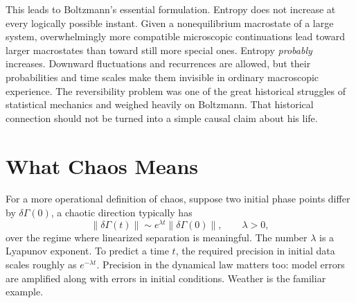 \begin{classroomqa}
\end{classroomqa}

\begin{classroomqa}
\end{classroomqa}

This leads to Boltzmann's essential formulation.  Entropy does not increase
at every logically possible instant.  Given a nonequilibrium macrostate of a
large system, overwhelmingly more compatible microscopic continuations lead
toward larger macrostates than toward still more special ones.  Entropy
\emph{probably} increases.  Downward fluctuations and recurrences are
allowed, but their probabilities and time scales make them invisible in
ordinary macroscopic experience.  The reversibility problem was one of the
great historical struggles of statistical mechanics and weighed heavily on
Boltzmann.  That historical connection should not be turned into a simple
causal claim about his life.

\section{What Chaos Means}

For a more operational definition of chaos, suppose
two initial phase points differ by \(\delta\Gamma(0)\), a chaotic direction
typically has
\begin{equation}
 \lVert\delta\Gamma(t)\rVert
 \sim e^{\lambda t}\lVert\delta\Gamma(0)\rVert,
 \qquad \lambda>0,
 \label{eq:sm7-lyapunov-growth}
\end{equation}
over the regime where linearized separation is meaningful.  The number
\(\lambda\) is a Lyapunov exponent.  To predict a time \(t\), the required
precision in initial data scales roughly as \(e^{-\lambda t}\).  Precision in
the dynamical law matters too: model errors are amplified along with errors
in initial conditions.  Weather is the familiar example.

